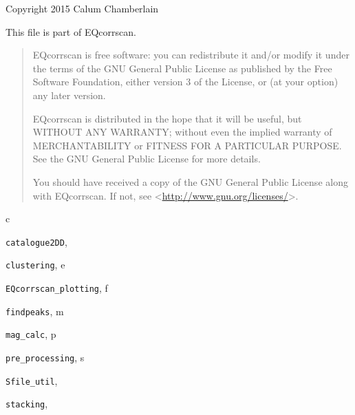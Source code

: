 \documentclass[a4paper,10pt,english]{sphinxmanual}
\begin{document}
Copyright 2015 Calum Chamberlain

This file is part of EQcorrscan.
\begin{quote}

EQcorrscan is free software: you can redistribute it and/or modify
it under the terms of the GNU General Public License as published by
the Free Software Foundation, either version 3 of the License, or
(at your option) any later version.

EQcorrscan is distributed in the hope that it will be useful,
but WITHOUT ANY WARRANTY; without even the implied warranty of
MERCHANTABILITY or FITNESS FOR A PARTICULAR PURPOSE.  See the
GNU General Public License for more details.

You should have received a copy of the GNU General Public License
along with EQcorrscan.  If not, see \textless{}\href{http://www.gnu.org/licenses/}{http://www.gnu.org/licenses/}\textgreater{}.
\end{quote}


\renewcommand{\indexname}{Python Module Index}
\begin{theindex}
\def\bigletter#1{{\Large\sffamily#1}\nopagebreak\vspace{1mm}}
\bigletter{c}
\item {\texttt{catalogue2DD}}, \pageref{utils:module-catalogue2DD}
\item {\texttt{clustering}}, \pageref{utils:module-clustering}
\indexspace
\bigletter{e}
\item {\texttt{EQcorrscan\_plotting}}, \pageref{utils:module-EQcorrscan_plotting}
\indexspace
\bigletter{f}
\item {\texttt{findpeaks}}, \pageref{utils:module-findpeaks}
\indexspace
\bigletter{m}
\item {\texttt{mag\_calc}}, \pageref{utils:module-mag_calc}
\indexspace
\bigletter{p}
\item {\texttt{pre\_processing}}, \pageref{utils:module-pre_processing}
\indexspace
\bigletter{s}
\item {\texttt{Sfile\_util}}, \pageref{utils:module-Sfile_util}
\item {\texttt{stacking}}, \pageref{utils:module-stacking}
\end{theindex}

\renewcommand{\indexname}{Index}
\printindex
\end{document}
